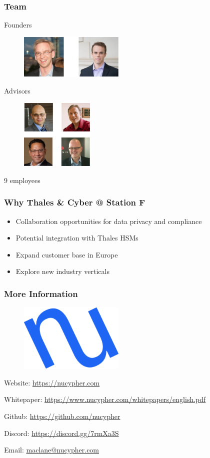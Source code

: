 \documentclass[xetex,mathsans,sans]{beamer}
\begin{document}
    \begin{frame}
      \frametitle{Team}
        Founders
        \begin{figure}
            \centering
            \includegraphics[width=5cm]{pdf/founders.pdf}
        \end{figure}

        Advisors
        \begin{figure}
            \centering
            \includegraphics[width=3.5cm]{pdf/advisors.pdf}
        \end{figure}

        9 employees
    \end{frame}

    \begin{frame}
      \frametitle{Why Thales \& Cyber @ Station F}
      \begin{itemize}
          \item Collaboration opportunities for data privacy and compliance
          \item Potential integration with Thales HSMs
          \item Expand customer base in Europe
          \item Explore new industry verticals
      \end{itemize}
    \end{frame}

    \begin{frame}
        \frametitle{More Information}
        \begin{figure}
            \centering
            \includegraphics[width=5cm]{pdf/nucypher_logo.pdf}
        \end{figure}
        Website: \url{https://nucypher.com}

        Whitepaper: \url{https://www.nucypher.com/whitepapers/english.pdf}

        Github: \url{https://github.com/nucypher}

        Discord: \url{https://discord.gg/7rmXa3S}

        Email: \href{mailto:maclane@nucypher.com}{maclane@nucypher.com}
    \end{frame}
\end{document}
